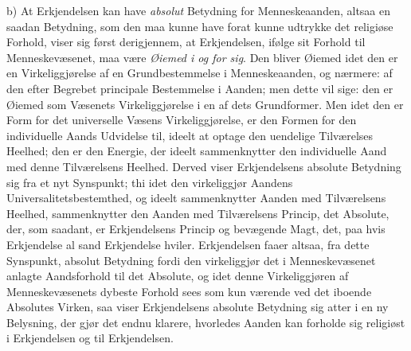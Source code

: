 b) At Erkjendelsen kan have \emph{absolut} Betydning for Menneskeaanden, altsaa
en saadan Betydning, som den maa kunne have forat kunne udtrykke det religiøse
Forhold, viser sig først derigjennem, at Erkjendelsen, ifølge sit Forhold til
Menneskevæsenet, maa være \emph{Øiemed i og for sig}. Den bliver Øiemed idet
den er en Virkeliggjørelse af en Grundbestemmelse i Menneskeaanden, og
nærmere: af den efter
 Begrebet principale Bestemmelse i Aanden; men dette vil sige: den er Øiemed som
Væsenets Virkeliggjørelse i en af dets Grundformer. Men idet den er Form for
det universelle Væsens Virkeliggjørelse, er den Formen for den individuelle
Aands Udvidelse til, ideelt at optage den uendelige Tilværelses Heelhed; den er
den Energie, der ideelt sammenknytter den individuelle Aand med denne
Tilværelsens Heelhed. Derved viser Erkjendelsens absolute Betydning sig fra et
nyt Synspunkt; thi idet den virkeliggjør Aandens Universalitetsbestemthed, og
ideelt sammenknytter Aanden med Tilværelsens Heelhed, sammenknytter den Aanden
med Tilværelsens Princip, det Absolute, der, som saadant, er Erkjendelsens
Princip og bevægende Magt, det, paa hvis Erkjendelse al sand Erkjendelse
hviler. Erkjendelsen faaer altsaa, fra dette Synspunkt, absolut Betydning fordi
den virkeliggjør det i Menneskevæsenet anlagte Aandsforhold til det Absolute,
og idet denne Virkeliggjøren af Menneskevæsenets dybeste Forhold sees som kun
værende ved det iboende Absolutes Virken, saa viser Erkjendelsens absolute
Betydning sig atter i en ny Belysning, der gjør det endnu klarere, hvorledes
Aanden kan forholde sig religiøst i Erkjendelsen og til Erkjendelsen.

